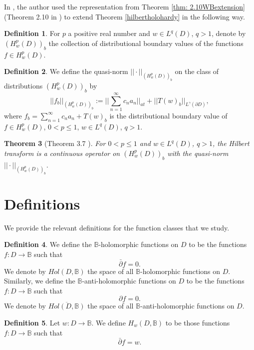 \documentclass[suppldata]{interact}
\theoremstyle{plain}%
\newtheorem{theorem}{Theorem}[section]
\theoremstyle{definition}
\newtheorem{deff}[theorem]{Definition}
\theoremstyle{remark}
\newcommand{\p}{\partial}
\newcommand{\dbar}{\bar\partial}
\newcommand{\bc}{\mathbb{B}}
\newcommand{\holb}{Hol(D,\bc)}
\newcommand{\hw}{H_w(D, \bc)}
\begin{document}
In \cite{WB}, the author used the representation from Theorem \ref{thm: 2.10WBextension} (Theorem 2.10 in \cite{WB}) to extend Theorem \ref{hilbertholohardy} in the following way. 

\begin{deff}
For $p$ a positive real number and $w \in L^q(D)$, $q>1$, denote by $(H^p_w(D))_b$ the collection of distributional boundary values of the functions $f \in H^p_w(D)$. 
\end{deff}

\begin{deff}
We define the quasi-norm $||\cdot||_{(H^p_w(D))_b}$ on the class of distributions $(H^p_w(D))_b$ by 
\[
    ||f_b||_{(H^p_w(D))_b} := ||\sum_{n=1}^\infty c_n a_n ||_{at} + ||T(w)_b||_{L^\gamma(\p D)},
\]
where $f_b = \sum_{n=1}^\infty c_n a_n + T(w)_b$ is the distributional boundary value of $f \in H^p_w(D)$, $0 < p \leq 1$, $w \in L^q(D)$, $q>1$. 
\end{deff}

\begin{theorem}[Theorem 3.7 \cite{WB}]\label{hilbertcontnonhomoghardy}
For $0 < p \leq 1$ and $w \in L^q(D)$, $q>1$, the Hilbert transform is a continuous operator on $(H^p_w(D))_b$ with the quasi-norm $||\cdot||_{(H^p_w(D))_b}$.
\end{theorem}




\section{Definitions}\label{DefsSect}

We provide the relevant definitions for the function classes that we study.

\begin{deff}
We define the $\bc$-holomorphic functions on $D$ to be the functions $f: D \to \bc$ such that 
    \[
        \dbar f = 0.
    \]
    We denote by $\holb$ the space of all $\bc$-holomorphic functions on $D$.  Similarly, we define the $\bc$-anti-holomorphic functions on $D$ to be the functions $f: D \to \bc$ such that 
    \[
        \p f = 0.
    \]
    We denote by $\overline{\holb}$ the space of all $\bc$-anti-holomorphic functions on $D$.
\end{deff}



\begin{deff}
Let $w: D \to \bc$. We define $\hw$ to be those functions $f: D \to \bc$ such that 
\[
    \dbar f = w.
\]
\end{deff}
\end{document}
